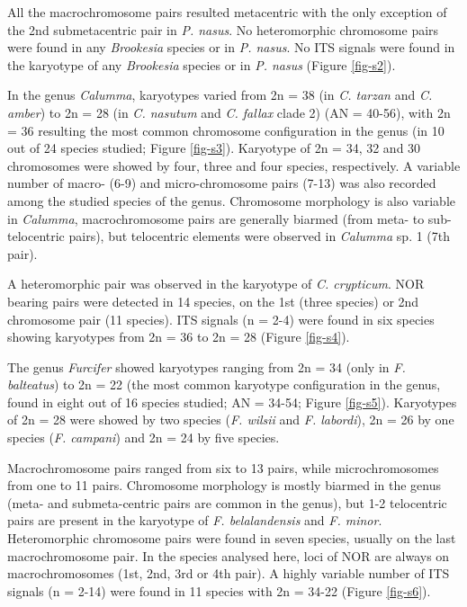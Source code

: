 \documentclass[a4paper, 12pt]{article}
\begin{document}
\noindent All the macrochromosome pairs resulted metacentric with the only exception of the 2nd submetacentric pair in \textit{P. nasus}. 
No heteromorphic chromosome pairs were found in any \textit{Brookesia} species or in \textit{P. nasus}.
No ITS signals were found in the karyotype of any \textit{Brookesia} species or in \textit{P. nasus} (Figure \ref{fig-s2}).

\noindent In the genus \textit{Calumma}, karyotypes varied from 2n = 38 (in \textit{C. tarzan} and \textit{C. amber}) to 2n = 28 (in \textit{C. nasutum} and \textit{C. fallax} clade 2) (AN = 40-56), with 2n = 36 resulting the most common chromosome configuration in the genus (in 10 out of 24 species studied; Figure \ref{fig-s3}). 
Karyotype of 2n = 34, 32 and 30 chromosomes were showed by four, three and four species, respectively. 
A variable number of macro- (6-9) and micro-chromosome pairs (7-13) was also recorded among the studied species of the genus. 
Chromosome morphology is also variable in \textit{Calumma}, macrochromosome pairs are generally biarmed (from meta- to sub-telocentric pairs), but telocentric elements were observed in \textit{Calumma} sp. 1 (7th pair). 

\noindent A heteromorphic pair was observed in the karyotype of \textit{C. crypticum}. 
NOR bearing pairs were detected in 14 species, on the 1st (three species) or 2nd chromosome pair (11 species). 
ITS signals (n = 2-4) were found in six species showing karyotypes from 2n = 36 to 2n = 28 (Figure \ref{fig-s4}).

\noindent The genus \textit{Furcifer} showed karyotypes ranging from 2n = 34 (only in \textit{F. balteatus}) to 2n = 22 (the most common karyotype configuration in the genus, found in eight out of 16 species studied; AN = 34-54; Figure \ref{fig-s5}). 
Karyotypes of 2n = 28 were showed by two species (\textit{F. wilsii} and \textit{F. labordi}), 2n = 26 by one species (\textit{F. campani}) and 2n = 24 by five species. 

\noindent Macrochromosome pairs ranged from six to 13 pairs, while microchromosomes from one to 11 pairs. 
Chromosome morphology is mostly biarmed in the genus (meta- and submeta-centric pairs are common in the genus), but 1-2 telocentric pairs are present in the karyotype of \textit{F. belalandensis} and \textit{F. minor}.
Heteromorphic chromosome pairs were found in seven species, usually on the last macrochromosome pair. 
In the species analysed here, loci of NOR are always on macrochromosomes (1st, 2nd, 3rd or 4th pair). 
A highly variable number of ITS signals (n = 2-14) were found in 11 species with 2n = 34-22 (Figure \ref{fig-s6}).
\end{document}
